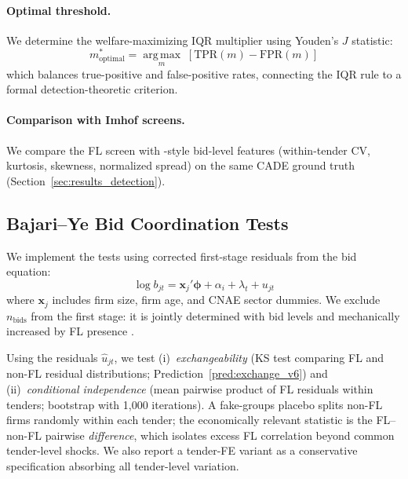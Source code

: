 \paragraph{Optimal threshold.}
We determine the welfare-maximizing IQR multiplier using Youden's $J$
statistic:
\begin{equation}
  m^*_{\text{optimal}} = \operatorname*{arg\,max}_m \;
  \left[\text{TPR}(m) - \text{FPR}(m)\right]
  \label{eq:youden}
\end{equation}
which balances true-positive and false-positive rates, connecting the
IQR rule to a formal detection-theoretic criterion.

\paragraph{Comparison with Imhof screens.}
We compare the FL screen with \citet{imhof2019detecting}-style
bid-level features (within-tender CV, kurtosis, skewness, normalized
spread) on the same CADE ground truth (Section~\ref{sec:results_detection}).


\subsection{Bajari--Ye Bid Coordination Tests}
\label{sec:bajari_ye}

We implement the \citet{bajari2003deciding} tests using corrected
first-stage residuals from the bid equation:
\begin{equation}
  \log b_{jt} = \mathbf{x}_j'\boldsymbol{\phi} + \alpha_i + \lambda_t
  + u_{jt}
  \label{eq:by_first_stage}
\end{equation}
where $\mathbf{x}_j$ includes firm size, firm age, and CNAE sector
dummies. We exclude $n_{\text{bids}}$ from the first stage: it is
jointly determined with bid levels and mechanically increased by FL
presence \citep[p.~978]{bajari2003deciding}.

Using the residuals $\hat{u}_{jt}$, we test (i)~\emph{exchangeability}
(KS test comparing FL and non-FL residual distributions;
Prediction~\ref{pred:exchange_v6}) and (ii)~\emph{conditional
independence} (mean pairwise product of FL residuals within tenders;
bootstrap with 1,000 iterations). A fake-groups placebo splits non-FL
firms randomly within each tender; the economically relevant statistic
is the FL--non-FL pairwise \emph{difference}, which isolates excess
FL correlation beyond common tender-level shocks. We also report a
tender-FE variant as a conservative specification absorbing all
tender-level variation.

